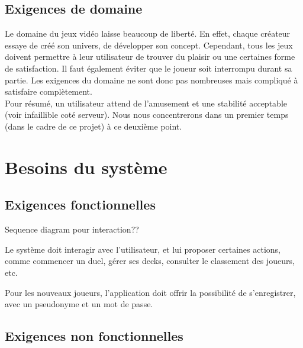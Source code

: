 \documentclass[11pt,a4paper]{article}
\begin{document}
\subsection{Exigences de domaine}
\label{sec:exi-dom}

  Le domaine du jeux vidéo laisse beaucoup de liberté.  En effet, chaque créateur essaye de créé son univers, de développer son concept.  Cependant, tous les jeux doivent permettre à leur utilisateur de trouver du plaisir ou une certaines forme de satisfaction.  Il faut également éviter que le joueur soit interrompu durant sa partie.  Les exigences du domaine ne sont donc pas nombreuses mais compliqué à satisfaire complètement.\\
  Pour résumé, un utilisateur attend de l'amusement et une stabilité acceptable (voir infaillible coté serveur).  Nous nous concentrerons dans un premier temps (dans le cadre de ce projet) à ce deuxième point.
  
  
\section{Besoins du système}
\label{sec:besoins-sys}


\subsection{Exigences fonctionnelles}
\label{sec:exi-fonc-sys}


Sequence diagram pour interaction??

Le système doit interagir avec l'utilisateur, et lui proposer certaines actions, comme commencer un duel, gérer ses decks, consulter le classement des joueurs, etc.

Pour les nouveaux joueurs, l'application doit offrir la possibilité de s'enregistrer, avec un pseudonyme et un mot de passe.


\subsection{Exigences non fonctionnelles}
\label{sec:exi-nonfonc-sys}
\end{document}
